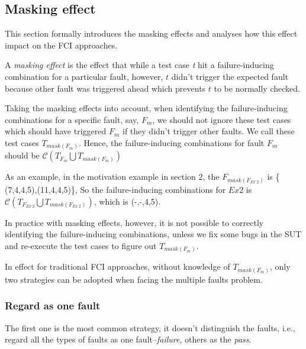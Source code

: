 \documentclass{sig-alternate}
\begin{document}
\subsection{Masking effect}
This section formally introduces the masking effects and analyses how this effect impact on the FCI approaches.
\begin{definition}
A \emph{masking effect} is the effect that while a test case \emph{t} hit a failure-inducing combination for a particular fault, however, $t$ didn't trigger the expected fault because other fault was triggered ahead which prevents $t$ to be normally checked.

\end{definition}

Taking the masking effects into account, when identifying the failure-inducing combinations for a specific fault, say, $F_{m}$, we should not ignore these test cases which should have triggered $F_{m}$ if they didn't trigger other faults. We call these test cases $T_{mask(F_{m})}$. Hence, the failure-inducing combinations for fault $F_{m}$ should be $\mathcal{C}(T_{F_{m}} \bigcup T_{mask(F_{m})})$


As an example, in the motivation example in section 2, the $F_{mask(F_{Ex\ 2})}$  is \{ (7,4,4,5),(11,4,4,5)\}, So the failure-inducing combinations for $Ex 2$ is $\mathcal{C}(T_{F_{Ex\ 2}} \bigcup T_{mask(F_{Ex\ 2})})$, which is (-,-,4,5).

In practice with masking effects, however, it is not possible to correctly identifying the failure-inducing combinations, unless we fix some bugs in the SUT and re-execute the test cases to figure out $T_{mask(F_{m})}$.

In effect for traditional FCI approaches, without knowledge of  $T_{mask(F_{m})}$,  only two strategies can be adopted when facing the multiple faults problem.

\subsubsection{Regard as one fault}
The first one is the most common strategy, it doesn't distinguish the faults, i.e., regard all the types of faults as one fault--\emph{failure}, others as the \emph{pass}.
\end{document}
